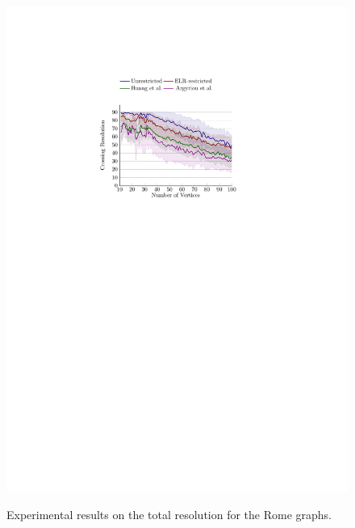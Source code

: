 \documentclass{comjnl}
\begin{document}
\begin{figure}[t]
{	\includegraphics[scale=0.99,page=12]{figures/rome_colored}}
	\caption{Experimental results on the total resolution for the Rome graphs.}
	\label{fig:to-res}
\end{figure}
\end{document}

